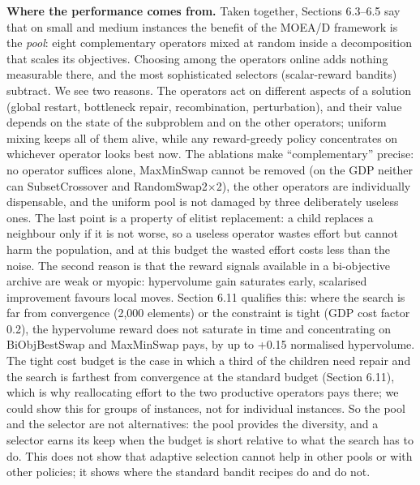 \textbf{Where the performance comes from.} Taken together, Sections 6.3--6.5 say that on small and medium instances the benefit of the MOEA/D framework is the \emph{pool}: eight complementary operators mixed at random inside a decomposition that scales its objectives. Choosing among the operators online adds nothing measurable there, and the most sophisticated selectors (scalar-reward bandits) subtract. We see two reasons. The operators act on different aspects of a solution (global restart, bottleneck repair, recombination, perturbation), and their value depends on the state of the subproblem and on the other operators; uniform mixing keeps all of them alive, while any reward-greedy policy concentrates on whichever operator looks best now. The ablations make ``complementary'' precise: no operator suffices alone, MaxMinSwap cannot be removed (on the GDP neither can SubsetCrossover and RandomSwap2$\times$2), the other operators are individually dispensable, and the uniform pool is not damaged by three deliberately useless ones. The last point is a property of elitist replacement: a child replaces a neighbour only if it is not worse, so a useless operator wastes effort but cannot harm the population, and at this budget the wasted effort costs less than the noise. The second reason is that the reward signals available in a bi-objective archive are weak or myopic: hypervolume gain saturates early, scalarised improvement favours local moves. Section 6.11 qualifies this: where the search is far from convergence (2,000 elements) or the constraint is tight (GDP cost factor 0.2), the hypervolume reward does not saturate in time and concentrating on BiObjBestSwap and MaxMinSwap pays, by up to +0.15 normalised hypervolume. The tight cost budget is the case in which a third of the children need repair and the search is farthest from convergence at the standard budget (Section 6.11), which is why reallocating effort to the two productive operators pays there; we could show this for groups of instances, not for individual instances. So the pool and the selector are not alternatives: the pool provides the diversity, and a selector earns its keep when the budget is short relative to what the search has to do. This does not show that adaptive selection cannot help in other pools or with other policies; it shows where the standard bandit recipes do and do not.

